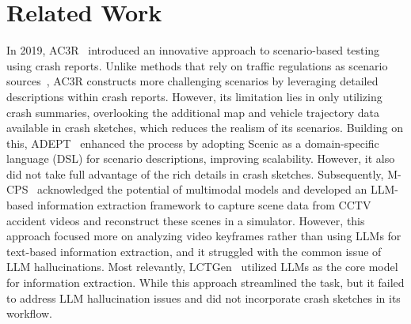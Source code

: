 
\section{Related Work}
\label{sec:re_work}

In 2019, AC3R~\cite{gambi2019generating} introduced an innovative approach to scenario-based testing using crash reports. Unlike methods that rely on traffic regulations as scenario sources~\cite{sun2022lawbreaker,deng2021rmt}, AC3R constructs more challenging scenarios by leveraging detailed descriptions within crash reports. However, its limitation lies in only utilizing crash summaries, overlooking the additional map and vehicle trajectory data available in crash sketches, which reduces the realism of its scenarios. Building on this, ADEPT~\cite{wang2022adept} enhanced the process by adopting Scenic as a domain-specific language (DSL) for scenario descriptions, improving scalability. However, it also did not take full advantage of the rich details in crash sketches. Subsequently, M-CPS~\cite{zhang2023building} acknowledged the potential of multimodal models and developed an LLM-based information extraction framework to capture scene data from CCTV accident videos and reconstruct these scenes in a simulator. However, this approach focused more on analyzing video keyframes rather than using LLMs for text-based information extraction, and it struggled with the common issue of LLM hallucinations. Most relevantly, LCTGen~\cite{tan2023language} utilized LLMs as the core model for information extraction. While this approach streamlined the task, but it  failed to address LLM hallucination issues and did not incorporate crash sketches in its workflow.
\vspace{-2mm}
